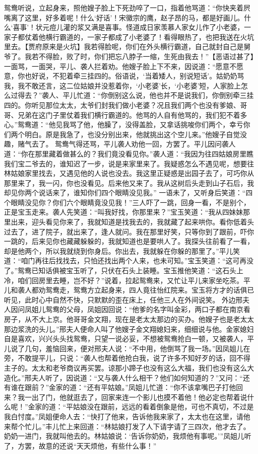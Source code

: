 \documentclass[12pt,oneside]{book}
\begin{document}
鸳鸯听说，立起身来，照他嫂子脸上下死劲啐了一口，指着他骂道：“你快夹着屄嘴离了这里，好多着呢！什么‘好话’！宋徽宗的鹰，赵子昂的马，都是好画儿。什么‘喜事’！状元痘儿灌的浆又满是喜事。怪道成日家羡慕人家女儿作了小老婆，一家子都仗着他横行霸道的，一家子都成了小老婆了！看得眼热了，也把我送在火坑里去。【贾府原来是火坑】我若得脸呢，你们在外头横行霸道，自己就封自己是舅爷了。我若不得脸，败了时，你们把忘八脖子一缩，生死由我去！”【恶语过甚了】一面骂，一面哭，平儿、袭人拦着劝。他嫂子脸上下不来，因说道：“愿意不愿意，你也好说，不犯着牵三挂四的。俗语说，‘当着矮人，别说短话’。姑奶奶骂我，我不敢还言，这二位姑娘并没惹着你，‘小老婆’长，‘小老婆’短，人家脸上怎么过得去？”袭人、平儿忙道：“你倒别这么说，他也并不是说我们，你倒别牵三挂四的。你听见那位太太，太爷们封我们做小老婆？况且我们两个也没有爹娘、哥哥、兄弟在这门子里仗着我们横行霸道的。他骂的人自有他骂的，我们犯不着多心。”鸳鸯道：“他见我骂了他，他臊了，没得盖脸，又拿话挑唆你们两个，幸亏你们两个明白。原是我急了，也没分别出来，他就挑出这个空儿来。”他嫂子自觉没趣，赌气去了。
鸳鸯气得还骂，平儿袭人劝他一回，方罢了。平儿因问袭人道：“你在那里藏着做甚么的？我们竟没看见你。”袭人道：“我因为往四姑娘房里瞧我们宝二爷去的，谁知迟了一步，说是来家里来了。我疑惑怎么不遇见呢，想要往林姑娘家里找去，又遇见他的人说也没去。我这里正疑惑是出园子去了，可巧你从那里来了，我一闪，你也没看见。后来他又来了。我从这树后头走到山子石后，我却见你两个说话来了，谁知你们四个眼睛没见我。”
一语未了，又听身后笑道：“四个眼睛没见你？你们六个眼睛竟没见我！”三人吓了一跳，回身一看，不是别个，正是宝玉走来。袭人先笑道：“叫我好找，你那里来？”宝玉笑道：“我从四妹妹那里出来，迎头看见你来了，我就知道是找我去的，我就藏了起来哄你。看你低着头过去了，进了院子，就出来了，逢人就问。我在那里好笑，只等你到了跟前，吓你一跳的，后来见你也藏藏躲躲的，我就知道也是要哄人了。我探头往前看了一看，却是他两个，所以我就绕到你身后。你出去，我就躲在你躲的那里了。”平儿笑道：“咱门再往后找找去，只怕还找出两个人来，也未可知。”宝玉笑道：“这可再没了。”鸳鸯已知话俱被宝玉听了，只伏在石头上装睡。宝玉推他笑道：“这石头上冷，咱们回房里去睡，岂不好？”说着，拉起鸳鸯来，又忙让平儿来家坐吃茶。平儿和袭人都劝鸳鸯走，鸳鸯方立起身来，四人竟往怡红院来。宝玉将方才的话俱已听见，此时心中自然不快，只默默的歪在床上，任他三人在外间说笑。
外边邢夫人因问凤姐儿鸳鸯的父母，凤姐因回说：“他爹的名字叫金彩，两口子都在南京看房子，从不大上京。他哥哥金文翔，现在是老太太那边的买办。他嫂子也是老太太那边浆洗的头儿。”邢夫人便命人叫了他嫂子金文翔媳妇来，细细说与他。金家媳妇自是喜欢，兴兴头头找鸳鸯，只望一说必妥，不想被鸳鸯抢白一顿，又被袭人，平儿说了几句，羞恼回来，便对邢夫人说：“不中用，他倒骂了我一场。”因凤姐儿在旁，不敢提平儿，只说：“袭人也帮着他抢白我，说了许多不知好歹的话，回不得主子的。太太和老爷商议再买罢。谅那小蹄子也没有这么大福，我们也没有这么大造化。”邢夫人听了，因说道：“又与袭人什么相干？他们如何知道的？”又问：“还有谁在跟前？”金家的道：“还有平姑娘。”凤姐儿忙道：“你不该拿嘴巴子打他回来？我一出了门，他就逛去了，回家来连一个影儿也摸不着他！他必定也帮着说什么呢！”金家的道：“平姑娘没在跟前，远远的看着倒象是他，可也不真切，不过是我白忖度。”凤姐便命人去：“快打了他来，告诉他我来家了，太太也在这里，请他来帮个忙儿。”丰儿忙上来回道：“林姑娘打发了人下请字请了三四次，他才去了。奶奶一进门，我就叫他去的。林姑娘说：‘告诉你奶奶，我烦他有事呢。’”凤姐儿听了，方罢，故意的还说“天天烦他，有些什么事！”
\end{document}
